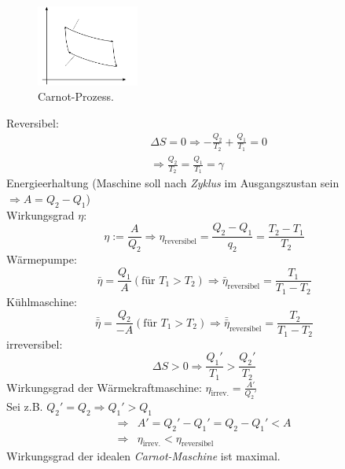 \begin{enumerate}
    \begin{figure}[H]
        \begin{center}
            \includegraphics[width=0.3\textwidth]{../img/carnotprocess.pdf}
            \caption{Carnot-Prozess.}
            \label{img:carnot}
        \end{center}
    \end{figure}
    
    Reversibel:
    \begin{equation}
        \begin{split}
            & \Delta S = 0 \Rightarrow - \frac{Q_2}{T_2} + \frac{Q_1}{T_1} = 0  \\
            & \Rightarrow \frac{Q_2}{T_2} = \frac{Q_1}{T_1} = \gamma
        \end{split}
    \end{equation}
    Energieerhaltung (Maschine soll nach \emph{Zyklus} im Ausgangszustan sein $\Rightarrow A = Q_2 - Q_1$) \\
    Wirkungsgrad $\eta$:
    \begin{equation}
        \eta := \frac{A}{Q_2} \Rightarrow \eta_{\text{reversibel}} = \frac{Q_2 - Q_1}{q_2} = \frac{T_2 - T_1}{T_2}
    \end{equation}
    Wärmepumpe:
    \begin{equation}
        \bar{\eta} = \frac{Q_1}{A} (\text{für } T_1 > T_2) \Rightarrow \bar{\eta}_{\text{reversibel}} = \frac{T_1}{T_1 - T_2}
    \end{equation}
    Kühlmaschine:
    \begin{equation}
        \bar{\bar{\eta}} = \frac{Q_2}{-A} (\text{für } T_1 > T_2) \Rightarrow \bar{\bar{\eta}}_{\text{reversibel}} = \frac{T_2}{T_1-T_2}
    \end{equation}
    irreversibel:
    \begin{equation}
        \Delta S > 0 \Rightarrow \frac{Q_1'}{T_1} > \frac{Q_2'}{T_2}
    \end{equation}
    Wirkungsgrad der Wärmekraftmaschine: $\eta_{\text{irrev.}} = \frac{A'}{Q_2'}$ \\
    Sei z.B. $Q_2' = Q_2 \Rightarrow Q_1' > Q_1$
    \begin{equation}
        \begin{split}
            \Rightarrow & A' = Q_2' - Q_1' = Q_2 - Q_1' < A \\
            \Rightarrow & \eta_\text{irrev.} < \eta_\text{reversibel}
        \end{split}
    \end{equation}
    Wirkungsgrad der idealen \emph{Carnot-Maschine} ist maximal.
\end{enumerate}

